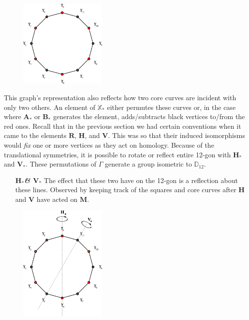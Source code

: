 \documentclass[]{article}
\begin{document}
\begin{figure}[H]
\centering
\includegraphics[width=1.7in]{12gon.pdf}
\end{figure}

This graph's representation also reflects how two core curves are incident with only two others. An element of $\mathbb X_*$ either permutes these curves or, in the case where $\mathbf A_*$ or $\mathbf B_*$ generates the element, adds/subtracts black vertices to/from the red ones. Recall that in the previous section we had certain conventions when it came to the elements $\mathbf{R}$, $\mathbf{H}$, and $\mathbf{V}$. This was so that their induced isomorphisms would \emph{fix} one or more vertices as they act on homology. Because of the translational symmetries, it is possible to rotate or reflect entire 12-gon with $\mathbf{H}_*$ and $\mathbf{V}_*$. These permutations of $\Gamma$ generate a group isometric to $\mathbb{D}_{12}$.


\begin{minipage}{0.5\textwidth}
\vspace{0.3in}
\begin{itemize}
\item[\textbf{\emph{$\mathbf{H}_*$\& $\mathbf{V}_*$}}] The effect that these two have on the 12-gon is a reflection about these lines. Observed by keeping track of the squares and core curves after $\mathbf{H}$ and $\mathbf{V}$ have acted on $\mathbf{M}$.
\end{itemize}
\end{minipage}
\begin{minipage}{0.7\textwidth}
\begin{figure}[H]
\hspace{0.2in}\includegraphics[width=1.7in]{12gonHV.pdf}
\end{figure}
\end{minipage}
\end{document}

